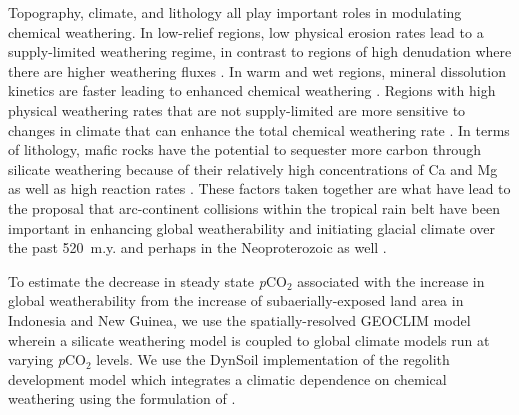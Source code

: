 \documentclass[11pt,letterpaper]{article}
\newcommand{\pCOtwo}{\textit{p}CO$_{2}$\xspace}
\begin{document}
Topography, climate, and lithology all play important roles in modulating chemical weathering. In low-relief regions, low physical erosion rates lead to a supply-limited weathering regime, in contrast to regions of high denudation where there are higher weathering fluxes \citep{Gabet2009a, West2012a, Maher2014a}. In warm and wet regions, mineral dissolution kinetics are faster leading to enhanced chemical weathering \citep{Lasaga1994a, West2012a}. Regions with high physical weathering rates that are not supply-limited are more sensitive to changes in climate that can enhance the total chemical weathering rate \citep{West2012a, Maher2014a}. In terms of lithology, mafic rocks have the potential to sequester more carbon through silicate weathering because of their relatively high concentrations of Ca and Mg as well as high reaction rates \citep{Dessert2003a}. These factors taken together are what have lead to the proposal that arc-continent collisions within the tropical rain belt have been important in enhancing global weatherability and initiating glacial climate over the past 520~m.y. \citep{Jagoutz2016a, Swanson-Hysell2017a, Macdonald2019a} and perhaps in the Neoproterozoic as well \citep{Park2019a}.

To estimate the decrease in steady state \pCOtwo associated with the increase in global weatherability from the increase of subaerially-exposed land area in Indonesia and New Guinea, we use the spatially-resolved GEOCLIM model \citep{Godderis2014a, Godderis2017c} wherein a silicate weathering model is coupled to global climate models run at varying \pCOtwo levels. We use the DynSoil implementation of the \citet{Gabet2009a} regolith development model which integrates a climatic dependence on chemical weathering using the formulation of \cite{West2012a}.
\end{document}
